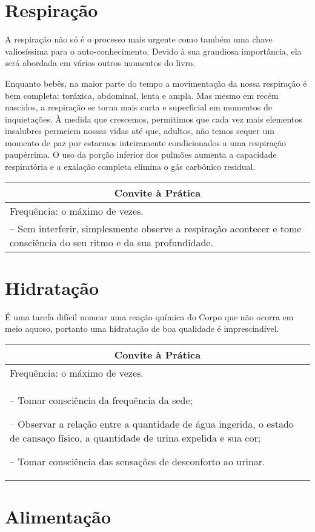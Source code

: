 \documentclass[oneside, 12pt]{book}
\newenvironment{prat}[1]
{\begin{center}
\begin{tabular}{p{0.9\textwidth}}
\hline\hline
\multicolumn{1}{c}{Convite à Prática}\\
\hline
Frequência: #1.\\
\hline
}{\\
\hline\hline
\end{tabular} 
\end{center}}
\begin{document}
\section*{Respiração}

A respiração não só é o processo mais urgente como também uma chave valiosíssima para o auto-conhecimento. Devido à sua grandiosa importância, ela será abordada em vários outros momentos do livro.

Enquanto bebês, na maior parte do tempo a movimentação da nossa respiração é bem completa: toráxica, abdominal, lenta e ampla. Mas mesmo em recém nascidos, a respiração se torna mais curta e superficial em momentos de inquietações. À medida que crescemos, permitimos que cada vez mais elementos insalubres permeiem nossas vidas até que, adultos, não temos sequer um momento de paz por estarmos inteiramente condicionados a uma respiração paupérrima. O uso da porção inferior dos pulmões aumenta a capacidade respiratória e a exalação completa elimina o gás carbônico residual.

\begin{prat}{o máximo de vezes}
-- Sem interferir, simplesmente observe a respiração acontecer e tome consciência do seu ritmo e da sua profundidade.
\end{prat}

\section*{Hidratação}

É uma tarefa difícil nomear uma reação química do Corpo que não ocorra em meio aquoso, portanto uma hidratação de boa qualidade é imprescindível.

\begin{prat}{o máximo de vezes}
-- Tomar consciência da frequência da sede;

-- Observar a relação entre a quantidade de água ingerida, o estado de cansaço físico, a quantidade de urina expelida e sua cor;

-- Tomar consciência das sensações de desconforto ao urinar.
\end{prat}

\section*{Alimentação}
\end{document}
